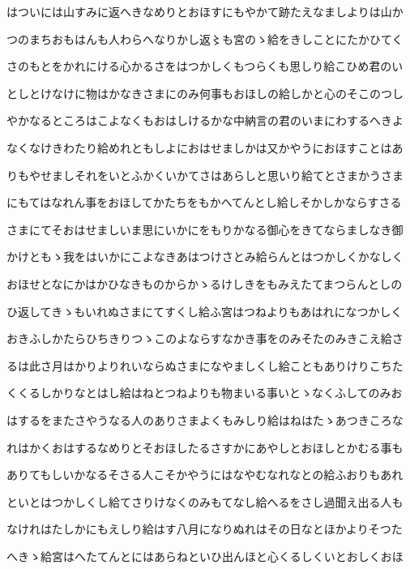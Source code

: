 \documentclass[a4paper,11pt,landscape]{ltjtarticle}
\begin{document}
\par\medskip
はついには山すみに返へきなめりとおほすにもやかて跡たえなましよりは山か
\par\medskip
つのまちおもはんも人わらへなりかし返〻も宮のゝ給をきしことにたかひてく
\par\medskip
さのもとをかれにける心かるさをはつかしくもつらくも思しり給こひめ君のい
\par\medskip
としとけなけに物はかなきさまにのみ何事もおほしの給しかと心のそこのつし
\par\medskip
やかなるところはこよなくもおはしけるかな中納言の君のいまにわするへきよ
\par\medskip
なくなけきわたり給めれともしよにおはせましかは又かやうにおほすことはあ
\par\medskip
りもやせましそれをいとふかくいかてさはあらしと思いり給てとさまかうさま
\par\medskip
にもてはなれん事をおほしてかたちをもかへてんとし給しそかしかならすさる
\par\medskip
さまにてそおはせましいま思にいかにをもりかなる御心をきてならましなき御
\par\medskip
かけともゝ我をはいかにこよなきあはつけさとみ給らんとはつかしくかなしく
\par\medskip
おほせとなにかはかひなきものからかゝるけしきをもみえたてまつらんとしの
\par\medskip
ひ返してきゝもいれぬさまにてすくし給ふ宮はつねよりもあはれになつかしく
\par\medskip
おきふしかたらひちきりつゝこのよならすなかき事をのみそたのみきこえ給さ
\par\medskip
るは此さ月はかりよりれいならぬさまになやましくし給こともありけりこちた
\par\medskip
くくるしかりなとはし給はねとつねよりも物まいる事いとゝなくふしてのみお
\par\medskip
はするをまたさやうなる人のありさまよくもみしり給はねはたゝあつきころな
\par\medskip
れはかくおはするなめりとそおほしたるさすかにあやしとおほしとかむる事も
\par\medskip
ありてもしいかなるそさる人こそかやうにはなやむなれなとの給ふおりもあれ
\par\medskip
といとはつかしくし給てさりけなくのみもてなし給へるをさし過聞え出る人も
\par\medskip
なけれはたしかにもえしり給はす八月になりぬれはその日なとほかよりそつた
\par\medskip
へきゝ給宮はへたてんとにはあらねといひ出んほと心くるしくいとおしくおほ
\end{document}
